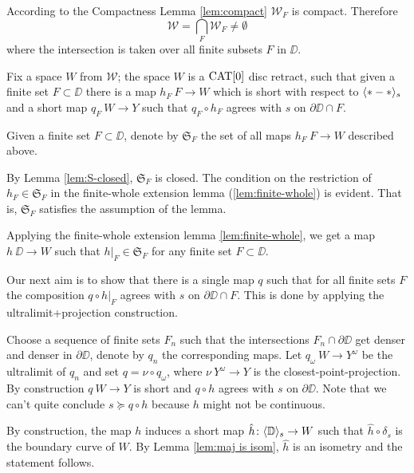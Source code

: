 According to the Compactness Lemma \ref{lem:compact} $\mathcal{W}_F$ is compact.
Therefore 
\[\mathcal{W}
=
\bigcap_{F}\mathcal{W}_F\ne \emptyset\]
where the intersection is taken over all finite subsets $F$ in $\DD$. 


Fix a space $W$ from $\mathcal{W}$;
the space $W$ is a $\mathop{\rm CAT}\nolimits[0]$ disc retract,
such that given a finite set $F\subset \DD$ there is a map $h_F\:F\to W$ which is short with 
respect to $\langle{*}-{*}\rangle_s$ 
and a short map $q_F\:W\to Y$ such that $q_F\circ h_F$ agrees with $s$ on $\partial\DD\cap F$.

Given a finite set $F\subset \DD$,
denote by $\mathfrak{S}_F$ the set of all maps $h_F\:F\to W$ described above.

By Lemma \ref{lem:S-closed}, $\mathfrak{S}_F$ is closed.
The condition on the restriction of $h_F\in  \mathfrak{S}_F$ in the finite-whole extension lemma (\ref{lem:finite-whole}) is evident.
That is, $\mathfrak{S}_F$ satisfies the assumption of the lemma.

Applying the finite-whole extension lemma \ref{lem:finite-whole},
we get a map $h\:\DD\to W$ such that $h|_F\in \mathfrak{S}_F$
for any finite set $F\subset \DD$.

Our next aim is to show that there is a single map $q$ such that
for all finite sets $F$ the composition $q\circ h|_F$ agrees with
$s$ on $\partial\DD\cap F$.
This is done by applying the ultralimit+projection construction.

Choose a sequence of finite sets $F_n$ such that the intersections $F_n\cap\partial \DD$ get denser and denser in $\partial \DD$, 
denote by $q_n$ the corresponding maps.
Let $q_\omega\:W\to Y^\omega$ be the ultralimit of $q_n$ and set $q=\nu\circ q_\omega$,
where $\nu\:Y^\omega\to Y$ is the closest-point-projection.
By construction $q\:W\to Y$ is short and $q\circ h$ agrees with $s$ on $\partial \DD$.
Note that we can't quite conclude $s\succcurlyeq q\circ h$ because $h$ might not be continuous.

By construction, the map $h$ induces a short map $\hat h\colon\langle\mathbb{D}\rangle_s\to W$ 
such that $\hat h\circ\delta_s$ is the boundary curve of $W$.
By Lemma \ref{lem:maj is isom}, $\hat h$ is an isometry and the statement follows.
\qeds